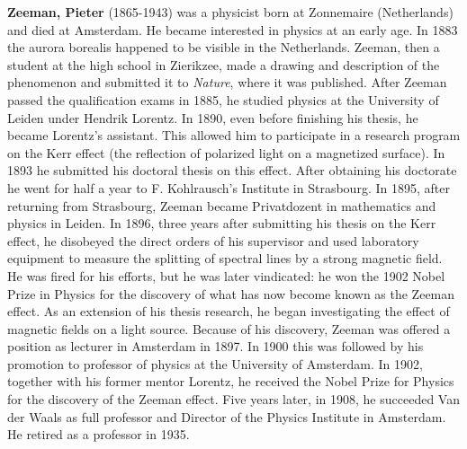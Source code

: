 \textbf{Zeeman, Pieter} (1865-1943) was a physicist born at Zonnemaire (Netherlands) and died at Amsterdam. He became interested in physics at an early age. In 1883 the aurora borealis happened to be visible in the Netherlands. Zeeman, then a student at the high school in Zierikzee, made a drawing and description of the phenomenon and submitted it to \textit{Nature}, where it was published. After Zeeman passed the qualification exams in 1885, he studied physics at the University of Leiden under Hendrik Lorentz. In 1890, even before finishing his thesis, he became Lorentz's assistant. This allowed him to participate in a research program on the Kerr effect (the reflection of polarized light on a magnetized surface). In 1893 he submitted his doctoral thesis on this effect. After obtaining his doctorate he went for half a year to F. Kohlrausch's Institute in Strasbourg. In 1895, after returning from Strasbourg, Zeeman became Privatdozent in mathematics and physics in Leiden. In 1896, three years after submitting his thesis on the Kerr effect, he disobeyed the direct orders of his supervisor and used laboratory equipment to measure the splitting of spectral lines by a strong magnetic field. He was fired for his efforts, but he was later vindicated: he won the 1902 Nobel Prize in Physics for the discovery of what has now become known as the Zeeman effect. As an extension of his thesis research, he began investigating the effect of magnetic fields on a light source. Because of his discovery, Zeeman was offered a position as lecturer in Amsterdam in 1897. In 1900 this was followed by his promotion to professor of physics at the University of Amsterdam. In 1902, together with his former mentor Lorentz, he received the Nobel Prize for Physics for the discovery of the Zeeman effect. Five years later, in 1908, he succeeded Van der Waals as full professor and Director of the Physics Institute in Amsterdam. He retired as a professor in 1935.